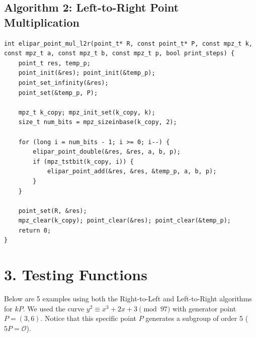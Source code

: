\documentclass[12pt,a4paper]{article}
\begin{document}
\subsection*{Algorithm 2: Left-to-Right Point Multiplication}
\begin{lstlisting}
int elipar_point_mul_l2r(point_t* R, const point_t* P, const mpz_t k, const mpz_t a, const mpz_t b, const mpz_t p, bool print_steps) {
    point_t res, temp_p;
    point_init(&res); point_init(&temp_p);
    point_set_infinity(&res);
    point_set(&temp_p, P);
    
    mpz_t k_copy; mpz_init_set(k_copy, k);
    size_t num_bits = mpz_sizeinbase(k_copy, 2);
    
    for (long i = num_bits - 1; i >= 0; i--) {
        elipar_point_double(&res, &res, a, b, p);
        if (mpz_tstbit(k_copy, i)) {
            elipar_point_add(&res, &res, &temp_p, a, b, p);
        }
    }
    
    point_set(R, &res);
    mpz_clear(k_copy); point_clear(&res); point_clear(&temp_p);
    return 0;
}
\end{lstlisting}

\section*{3. Testing Functions}
Below are 5 examples using both the Right-to-Left and Left-to-Right algorithms for $kP$. 
We used the curve $y^2 \equiv x^3 + 2x + 3 \pmod{97}$ with generator point $P = (3, 6)$. 
Notice that this specific point $P$ generates a subgroup of order 5 ($5P = \mathcal{O}$).
\end{document}

